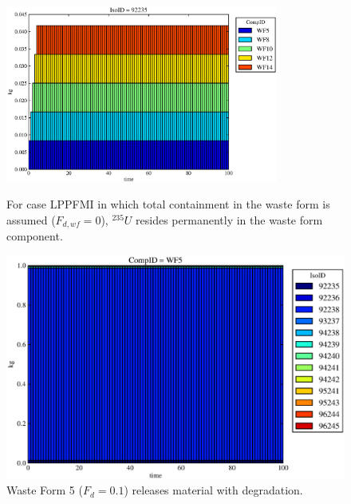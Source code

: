 \begin{figure}[ht]
\centering
\includegraphics[width=0.8\textwidth]{./chapters/demonstration/base/lpPFMI.eps}
\caption[$^{235}U$ residence. Lumped Parameter PFM Waste Form No Release.]{
For case LPPFMI  in which total containment in the waste form is assumed 
($F_{d,wf}=0$), $^{235}U$ resides permanently in the waste form component.
}
\label{fig:lpPFMIall}
\begin{minipage}[b]{0.45\linewidth}

  \includegraphics[width=\textwidth]{./chapters/demonstration/base/lpPFMI1.eps}
  \caption[LPPFMI Waste Form Contaminants.]{
    Waste Form 5 ($F_d = 0.1$) releases material with degradation. 
    }
  \label{fig:lpPFMIwf5}
  

\end{minipage}
\end{figure}
